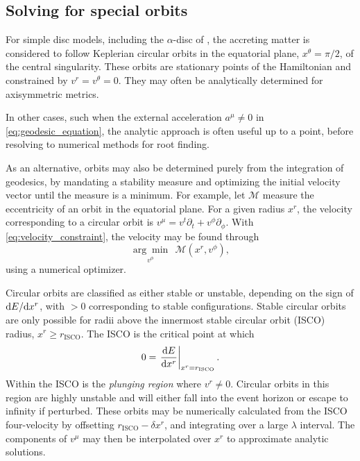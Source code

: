 \subsection{Solving for special orbits}

For simple disc models, including the $\alpha$-disc of \cite{shakura_black_1973}, the accreting matter is considered to follow Keplerian circular orbits in the equatorial plane, $x^\theta = \pi/2$, of the central singularity. These orbits are stationary points of the Hamiltonian and constrained by $v^r = v^\theta = 0$. They may often be analytically determined for axisymmetric metrics.

In other cases, such when the external acceleration $a^\mu \neq 0$ in \eqref{eq:geodesic_equation}, the analytic approach is often useful up to a point, before resolving to numerical methods for root finding.

As an alternative, orbits may also be determined purely from the integration of geodesics, by mandating a stability measure and optimizing the initial velocity vector until the measure is a minimum. For example, let $\mathscr{M}$ measure the eccentricity of an orbit in the equatorial plane. For a given radius $x^r$, the velocity corresponding to a circular orbit is $v^\mu = v^t \partial_t + v^\phi \partial_\phi $. With \eqref{eq:velocity_constraint}, the velocity may be found through
\begin{equation}
    \underset{v^\phi}{\arg \min}\ \ \mathscr{M}(x^r, v^\phi),
\end{equation}
using a numerical optimizer.

Circular orbits are classified as either stable or unstable, depending on the sign of $\text{d} E / \text{d} x^r$, with $>0$ corresponding to stable configurations. Stable circular orbits are only possible for radii above the innermost stable circular orbit (ISCO) radius, $x^r \geq r_\text{ISCO}$. The ISCO is the critical point at which 
\begin{equation}
    0 = \left. \frac{\text{d} E}{\text{d} x^r} \right\rvert_{x^r = r_\text{ISCO}}.
\end{equation}
Within the ISCO is the \textit{plunging region} where $v^r \neq 0$. Circular orbits in this region are highly unstable and will either fall into the event horizon or escape to infinity if perturbed. These orbits may be numerically calculated from the ISCO four-velocity by offsetting $r_\text{ISCO} -  \delta x^r$, and integrating over a large $\lambda$ interval. The components of $v^\mu$ may then be interpolated over $x^r$ to approximate analytic solutions.


